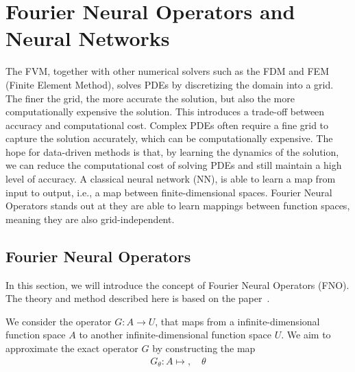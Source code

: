 \section{Fourier Neural Operators and Neural Networks}
The FVM, together with other numerical solvers such as the FDM and FEM (Finite Element Method), solves PDEs by discretizing the domain into a grid.
The finer the grid, the more accurate the solution, but also the more computationally expensive the solution. This introduces a trade-off between accuracy and computational cost.
Complex PDEs often require a fine grid to capture the solution accurately, which can be computationally expensive.
The hope for data-driven methods is that, by learning the dynamics of the solution, we can reduce the computational cost of solving PDEs and still maintain a high level of accuracy.
A classical neural network (NN), is able to learn a map from input to output, i.e., a map between finite-dimensional spaces.
Fourier Neural Operators stands out at they are able to learn mappings between function spaces, meaning they are also grid-independent.



\subsection{Fourier Neural Operators}
In this section, we will introduce the concept of Fourier Neural Operators (FNO).
The theory and method described here is based on the paper~\cite{FNO_2021}.

We consider the operator $G: A \to U$, that maps from a infinite-dimensional function space $A$ to another infinite-dimensional function space $U$.
We aim to approximate the exact operator $G$ by constructing the map
\begin{align*}
    G_{\theta}: A \mapsto, \quad \theta 
\end{align*} 

